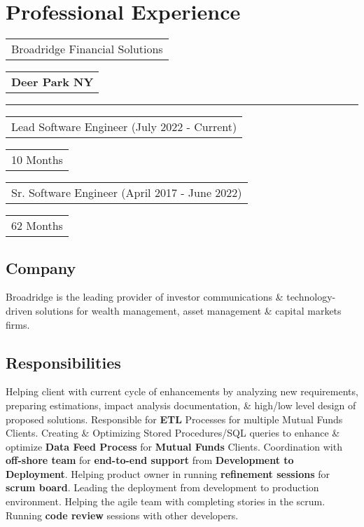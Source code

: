 \documentclass[letterpaper,11pt]{article}
\begin{document}
\section{Professional Experience}


    \noindent
    \begin{tabular}[t]{@{}l}
    \Large{Broadridge Financial Solutions}
    \end{tabular}
    \hfill
    \begin{tabular}[t]{l@{}}
    \textbf{\color{darkgray}Deer Park NY}
    \end{tabular}
    \noindent\rule{\textwidth}{0.5pt}
    \begin{tabular}[t]{@{}l}
    Lead Software Engineer (July 2022 - Current)
    \end{tabular}
    \hfill
    \begin{tabular}[t]{l@{}}
    10 Months
    \end{tabular}
    \begin{tabular}[t]{@{}l}
    Sr. Software Engineer (April 2017 - June 2022)
    \end{tabular}
    \hfill
    \begin{tabular}[t]{l@{}}
    62 Months
    \end{tabular}

    \subsection{Company}
    Broadridge is the leading provider of investor communications \& technology-driven solutions for wealth management, asset management \& capital markets firms.

    \subsection{Responsibilities}
    Helping client with current cycle of enhancements by analyzing new requirements, preparing estimations, impact analysis documentation, \& high/low level design of proposed solutions. Responsible for \textbf{\color{darkgray}ETL} Processes for multiple Mutual Funds Clients. Creating \& Optimizing Stored Procedures/SQL queries to enhance \& optimize \textbf{\color{darkgray}Data Feed Process} for \textbf{\color{darkgray}Mutual Funds} Clients. Coordination with \textbf{\color{darkgray}off-shore team} for \textbf{\color{darkgray}end-to-end support} from \textbf{\color{darkgray}Development to Deployment}. Helping product owner in running \textbf{\color{darkgray}refinement sessions} for \textbf{\color{darkgray}scrum board}. Leading the deployment from development to production environment. Helping the agile team with completing stories in the scrum. Running \textbf{\color{darkgray}code review} sessions with other developers.
\end{document}
